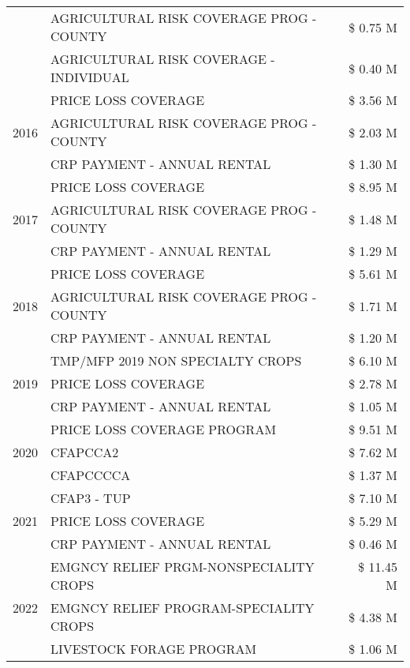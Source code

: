 \begin{tabular}{llr}
 & AGRICULTURAL RISK COVERAGE PROG - COUNTY & \$ 0.75 M \\
 & AGRICULTURAL RISK COVERAGE - INDIVIDUAL & \$ 0.40 M \\
\cline{1-3}
\multirow[t]{3}{*}{2016} & PRICE LOSS COVERAGE & \$ 3.56 M \\
 & AGRICULTURAL RISK COVERAGE PROG - COUNTY & \$ 2.03 M \\
 & CRP PAYMENT - ANNUAL RENTAL & \$ 1.30 M \\
\cline{1-3}
\multirow[t]{3}{*}{2017} & PRICE LOSS COVERAGE & \$ 8.95 M \\
 & AGRICULTURAL RISK COVERAGE PROG - COUNTY & \$ 1.48 M \\
 & CRP PAYMENT - ANNUAL RENTAL & \$ 1.29 M \\
\cline{1-3}
\multirow[t]{3}{*}{2018} & PRICE LOSS COVERAGE & \$ 5.61 M \\
 & AGRICULTURAL RISK COVERAGE PROG - COUNTY & \$ 1.71 M \\
 & CRP PAYMENT - ANNUAL RENTAL & \$ 1.20 M \\
\cline{1-3}
\multirow[t]{3}{*}{2019} & TMP/MFP 2019 NON SPECIALTY CROPS & \$ 6.10 M \\
 & PRICE LOSS COVERAGE & \$ 2.78 M \\
 & CRP PAYMENT - ANNUAL RENTAL & \$ 1.05 M \\
\cline{1-3}
\multirow[t]{3}{*}{2020} & PRICE LOSS COVERAGE PROGRAM & \$ 9.51 M \\
 & CFAPCCA2 & \$ 7.62 M \\
 & CFAPCCCCA & \$ 1.37 M \\
\cline{1-3}
\multirow[t]{3}{*}{2021} & CFAP3 - TUP & \$ 7.10 M \\
 & PRICE LOSS COVERAGE & \$ 5.29 M \\
 & CRP PAYMENT - ANNUAL RENTAL & \$ 0.46 M \\
\cline{1-3}
\multirow[t]{3}{*}{2022} & EMGNCY RELIEF PRGM-NONSPECIALITY CROPS & \$ 11.45 M \\
 & EMGNCY RELIEF PROGRAM-SPECIALITY CROPS & \$ 4.38 M \\
 & LIVESTOCK FORAGE PROGRAM & \$ 1.06 M \\
\cline{1-3}
\bottomrule
\end{tabular}
